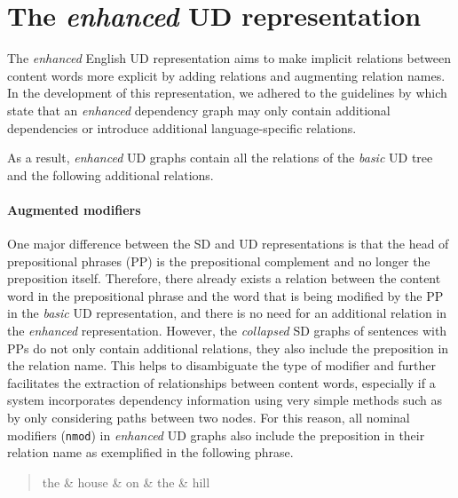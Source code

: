 \documentclass[10pt, a4paper]{article}
\begin{document}
\section{The \textit{enhanced} UD representation}

The \textit{enhanced} English UD representation aims to make implicit relations between content words 
more explicit by adding relations and augmenting relation names. In the development of
this representation, we adhered to the guidelines by  which state that an \textit{enhanced} 
dependency graph may only contain additional dependencies or introduce additional language-specific 
relations. 


As a result, \textit{enhanced} UD graphs contain all the relations of the \textit{basic} UD tree and
the following additional relations.

\paragraph{Augmented modifiers} One major difference between 
the SD and UD representations is that the head of prepositional phrases (PP)
is the prepositional complement and no longer the preposition itself. 
Therefore, there already exists a relation between the content word in
the prepositional phrase and the word that is being modified by the PP 
in the \textit{basic} UD representation, and there is no need for an 
additional relation in the \textit{enhanced} representation. 
However, the \textit{collapsed} SD graphs of sentences with PPs
do not only contain additional relations, they also include the 
preposition in the relation name. This helps to disambiguate the type of
modifier and further facilitates the extraction of 
relationships between content words, especially if a system incorporates 
dependency information using very simple methods
such as by only considering paths between two nodes.
For this reason, all nominal modifiers (\texttt{nmod}) in \textit{enhanced} UD graphs 
also include the preposition in their relation name as exemplified in the following phrase.

\begin{quote}
\begin{center}
\begin{dependency}[column sep=0.2em, edge unit distance=2.25ex]
  \begin{deptext}
    the \& house \& on \& the \& hill \\
  \end{deptext}
\end{dependency}
\end{center}
\end{quote}
\end{document}
